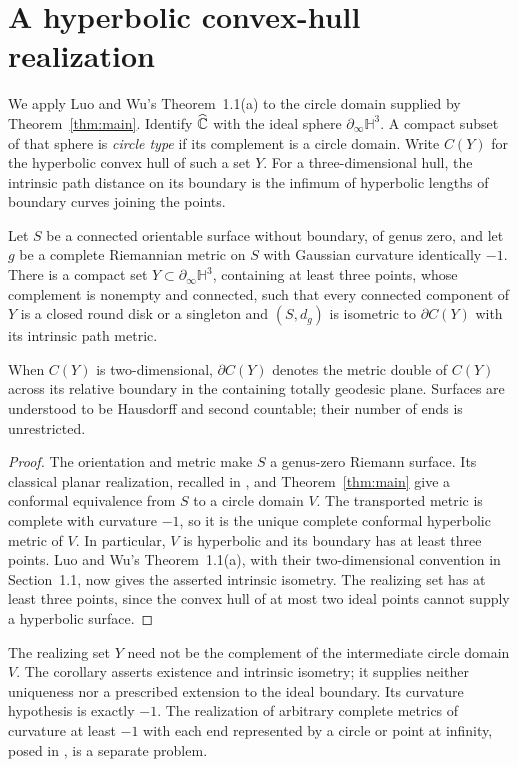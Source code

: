\section{A hyperbolic convex-hull realization}\label{sec:hyperbolic}

We apply Luo and Wu's Theorem~1.1(a) \cite{LuoWu2024} to the circle
domain supplied by Theorem~\ref{thm:main}. Identify $\widehat{\mathbb C}$ with the
ideal sphere $\partial_\infty\mathbb H^3$. A compact subset of that
sphere is \emph{circle type} if its complement is a circle domain.
Write $C(Y)$ for the hyperbolic convex hull of such a set $Y$.
For a three-dimensional hull, the intrinsic path distance on its boundary
is the infimum of hyperbolic lengths of boundary curves joining the points.

\begin{corollary}
\label{cor:hyperbolic}
Let $S$ be a connected orientable surface without boundary, of genus
zero, and let $g$ be a complete Riemannian metric on $S$ with Gaussian
curvature identically $-1$. There is a compact set
$Y\subset\partial_\infty\mathbb H^3$, containing at least three points,
whose complement is nonempty and connected, such that every connected
component of $Y$ is a closed round disk or a singleton and $(S,d_g)$
is isometric to $\partial C(Y)$ with its intrinsic path metric.

When $C(Y)$ is two-dimensional, $\partial C(Y)$ denotes the metric
double of $C(Y)$ across its relative boundary in the containing
totally geodesic plane. Surfaces are understood to be Hausdorff and
second countable; their number of ends is unrestricted.
\end{corollary}

\begin{proof}
The orientation and metric make $S$ a genus-zero Riemann surface.
Its classical planar realization, recalled in \cite[Section~1.1]{LuoWu2024},
and Theorem~\ref{thm:main} give a conformal equivalence from $S$ to a
circle domain $V$. The transported metric is complete with curvature
$-1$, so it is the unique complete conformal hyperbolic metric of $V$.
In particular, $V$ is hyperbolic and its boundary has at least three
points. Luo and Wu's Theorem~1.1(a), with their two-dimensional
convention in Section~1.1, now gives the asserted intrinsic isometry.
The realizing set has at least three points, since the convex hull of
at most two ideal points cannot supply a hyperbolic surface.
\end{proof}

The realizing set $Y$ need not be the complement of the intermediate
circle domain $V$. The corollary asserts existence and intrinsic
isometry; it supplies neither uniqueness nor a prescribed extension
to the ideal boundary. Its curvature hypothesis is exactly $-1$.
The realization of arbitrary complete metrics of curvature at least
$-1$ with each end represented by a circle or point at infinity, posed in
\cite[Section~1.2, Conjecture~3]{LuoWu2024}, is a separate problem.
